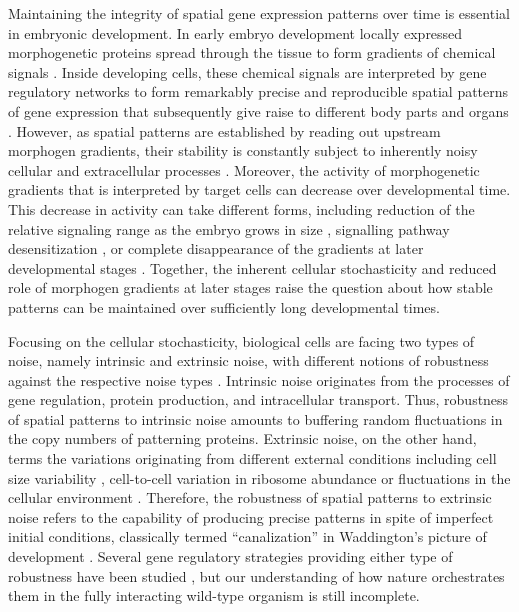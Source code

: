 \documentclass[a4paper,10pt]{article}
\begin{document}
Maintaining the integrity of spatial gene expression patterns over time is essential in embryonic development. In early embryo development locally expressed morphogenetic proteins spread through the tissue to form gradients of chemical signals \cite{Gregor2007a,Rogers2011,Lander2011,Balaskas2012,Kicheva2012,Shvartsman2012,Briscoe2015,Bier2015,Stapornwongkul2020,Stapornwongkul2021,Simsek2022}. Inside developing cells, these chemical signals are interpreted by gene regulatory networks to form remarkably precise and reproducible spatial patterns of gene expression that subsequently give raise to different body parts and organs \cite{Gregor2007b,DubuisPNAS2011,Sokolowski2012,Wu2015,Zagorski2017,Petkova2019,Kuzmicz-Kowalska2020,Tkacik2021,Exelby2021,Iyer2022,Sokolowski2023,Minchington2023}. However, as spatial patterns are established by reading out upstream morphogen gradients, their stability is constantly subject to inherently noisy cellular and extracellular processes \cite{Swain2002,Raser2005,Paulsson2005,Raj2008,Chalancon2012,Averbukh2017}. 
Moreover, the activity of morphogenetic gradients that is interpreted by target cells can decrease over developmental time. This decrease in activity can take different forms, including reduction of the relative signaling range as the embryo grows in size \cite{Zagorski2017,Kicheva2014}, signalling pathway desensitization \cite{Cohen2015}, or complete disappearance of the gradients at later developmental stages \cite{Drocco2011,Durrieu2018}. Together, the inherent cellular stochasticity and reduced role of morphogen gradients at later stages raise the question about how stable patterns can be maintained over sufficiently long developmental times.

Focusing on the cellular stochasticity, biological cells are facing two types of noise, namely intrinsic and extrinsic noise, with different notions of robustness against the respective noise types \cite{Swain2002,Raser2005,Paulsson2005,Raj2008,Chalancon2012,Averbukh2017}. Intrinsic noise originates from the processes of gene regulation, protein production, and intracellular transport. Thus,  robustness of spatial patterns to intrinsic noise amounts to buffering random fluctuations in the copy numbers of patterning proteins. Extrinsic noise, on the other hand, terms the variations originating from different external conditions including cell size variability \cite{Huh2011,Thomas2019}, cell-to-cell variation in ribosome abundance \cite{Raj2008} or fluctuations in the cellular environment \cite{Pedraza2005,Stockholm2010}. Therefore, the robustness of spatial patterns to extrinsic noise refers to the capability of producing precise patterns in spite of imperfect initial conditions, classically termed ``canalization'' in Waddington's picture of development \cite{Waddington1942,Waddington1959}. Several gene regulatory strategies providing either type of robustness have been studied \cite{Simsek2022,Iyer2022,Averbukh2017}, but our understanding of how nature orchestrates them in the fully interacting wild-type organism is still incomplete.
\end{document}
